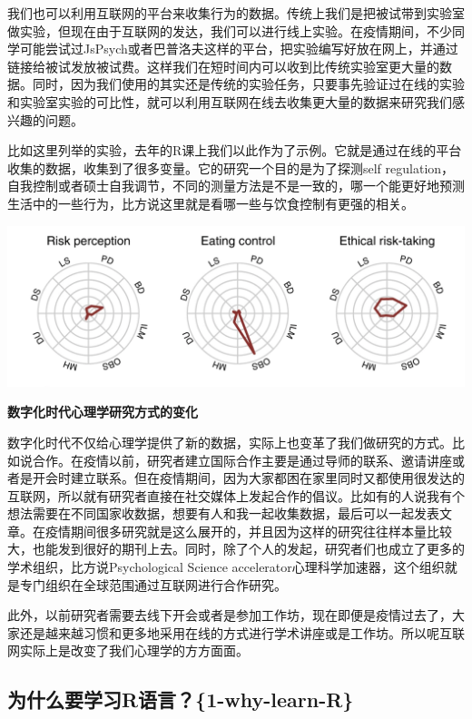 \documentclass[
  oneside]{book}
\begin{document}
我们也可以利用互联网的平台来收集行为的数据。传统上我们是把被试带到实验室做实验，但现在由于互联网的发达，我们可以进行线上实验。在疫情期间，不少同学可能尝试过JsPsych或者巴普洛夫这样的平台，把实验编写好放在网上，并通过链接给被试发放被试费。这样我们在短时间内可以收到比传统实验室更大量的数据。同时，因为我们使用的其实还是传统的实验任务，只要事先验证过在线的实验和实验室实验的可比性，就可以利用互联网在线去收集更大量的数据来研究我们感兴趣的问题。

比如这里列举的实验，去年的R课上我们以此作为了示例。它就是通过在线的平台收集的数据，收集到了很多变量。它的研究一个目的是为了探测self
regulation，自我控制或者硕士自我调节，不同的测量方法是不是一致的，哪一个能更好地预测生活中的一些行为，比方说这里就是看哪一些与饮食控制有更强的相关。

\includegraphics{1001-lesson1/image-20230302195303677.png}

\textbf{数字化时代心理学研究方式的变化}

数字化时代不仅给心理学提供了新的数据，实际上也变革了我们做研究的方式。比如说合作。在疫情以前，研究者建立国际合作主要是通过导师的联系、邀请讲座或者是开会时建立联系。但在疫情期间，因为大家都困在家里同时又都使用很发达的互联网，所以就有研究者直接在社交媒体上发起合作的倡议。比如有的人说我有个想法需要在不同国家收数据，想要有人和我一起收集数据，最后可以一起发表文章。在疫情期间很多研究就是这么展开的，并且因为这样的研究往往样本量比较大，也能发到很好的期刊上去。同时，除了个人的发起，研究者们也成立了更多的学术组织，比方说Psychological
Science
accelerator心理科学加速器，这个组织就是专门组织在全球范围通过互联网进行合作研究。

此外，以前研究者需要去线下开会或者是参加工作坊，现在即便是疫情过去了，大家还是越来越习惯和更多地采用在线的方式进行学术讲座或是工作坊。所以呢互联网实际上是改变了我们心理学的方方面面。

\hypertarget{ux4e3aux4ec0ux4e48ux8981ux5b66ux4e60rux8bedux8a001-why-learn-r}{%
\subsection{为什么要学习R语言？\{1-why-learn-R\}}\label{ux4e3aux4ec0ux4e48ux8981ux5b66ux4e60rux8bedux8a001-why-learn-r}}
\end{document}

